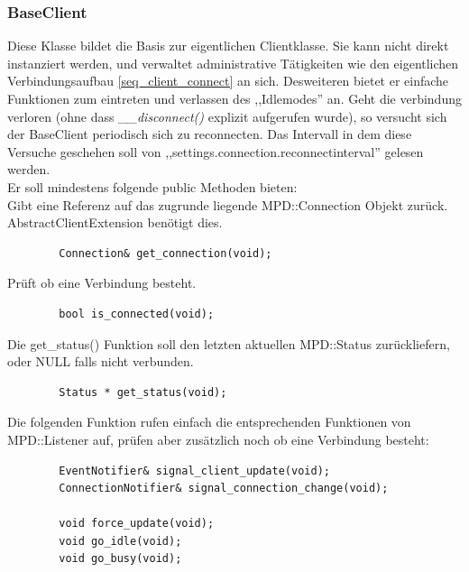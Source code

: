 \subsubsection{BaseClient}
Diese Klasse bildet die Basis zur eigentlichen Clientklasse. Sie kann nicht direkt instanziert werden,
und verwaltet administrative Tätigkeiten wie den eigentlichen Verbindungsaufbau \ref{seq_client_connect} an sich. 
Desweiteren bietet er einfache Funktionen zum eintreten und verlassen des ,,Idlemodes'' an.
Geht die verbindung verloren (ohne dass \emph{\_\_disconnect()} explizit aufgerufen wurde), so versucht sich der BaseClient periodisch sich zu reconnecten.
Das Intervall in dem diese Versuche geschehen soll von ,,settings.connection.reconnectinterval'' gelesen werden.
\\
Er soll mindestens folgende public Methoden bieten:
\\
Gibt eine Referenz auf das zugrunde liegende MPD::Connection Objekt zurück. 
AbstractClientExtension benötigt dies.
\begin{verbatim}
        Connection& get_connection(void);
\end{verbatim}
Prüft ob eine Verbindung besteht.
\begin{verbatim}
        bool is_connected(void);
\end{verbatim}
Die get\_status() Funktion soll den letzten aktuellen MPD::Status zurückliefern,
oder NULL falls nicht verbunden. 
\begin{verbatim}        
        Status * get_status(void);
\end{verbatim}

Die folgenden Funktion rufen einfach die entsprechenden Funktionen von MPD::Listener auf,
prüfen aber zusätzlich noch ob eine Verbindung besteht:
\begin{verbatim}
        EventNotifier& signal_client_update(void);
        ConnectionNotifier& signal_connection_change(void);

        void force_update(void);
        void go_idle(void);
        void go_busy(void);
\end{verbatim}

